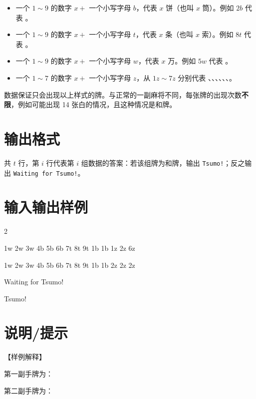 \documentclass{../cpct/ctpro}
\begin{document}
\begin{itemize}
    \item 一个 $1 \sim 9$ 的数字 $x+$ 一个小写字母 $b$，代表 $x$ 饼（也叫 $x$ 筒）。例如 $2b$ 代表 。
    \item 一个 $1 \sim 9$ 的数字 $x+$ 一个小写字母 $t$，代表 $x$ 条（也叫 $x$ 索）。例如 $8t$ 代表 。
    \item 一个 $1 \sim 9$ 的数字 $x+$ 一个小写字母 $w$，代表 $x$ 万。例如 $5w$ 代表 。
    \item 一个 $1 \sim 7$ 的数字 $x+$ 一个小写字母 $z$，从 $1z \sim 7z$ 分别代表 、、、、、、。
\end{itemize}

数据保证只会出现以上样式的牌。与正常的一副麻将不同，每张牌的出现次数\textbf{不限}，例如可能出现 14 张白的情况，且这种情况是和牌。

\section*{输出格式}

共 $t$ 行，第 $i$ 行代表第 $i$ 组数据的答案：若该组牌为和牌，输出 \texttt{Tsumo!}；反之输出 \texttt{Waiting for Tsumo!}。

\section*{输入输出样例}

\testcasetab
{
    2\par
    1w 2w 3w 4b 5b 6b 7t 8t 9t 1b 1b 1z 2z 6z\par
    1w 2w 3w 4b 5b 6b 7t 8t 9t 1b 1b 2z 2z 2z
}
{
    Waiting for Tsumo!\par
    Tsumo!
}

\section*{说明/提示}

【样例解释】

第一副手牌为：

\begin{center}
                 
\end{center}

第二副手牌为：
\end{document}
